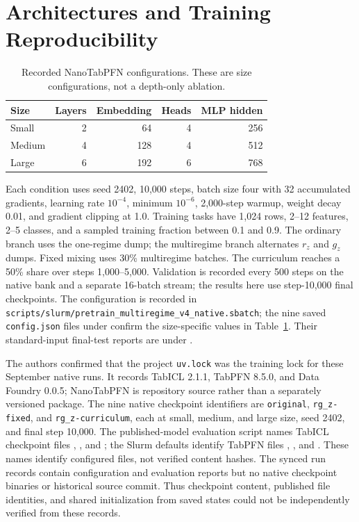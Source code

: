 \documentclass{article}
\begin{document}
\section{Architectures and Training Reproducibility}\label{app:training}
\begin{table}[h]\centering\small
\caption{Recorded NanoTabPFN configurations. These are size configurations, not a depth-only ablation.}\label{tab:arch}
\begin{tabular}{@{}lrrrr@{}}\toprule Size & Layers & Embedding & Heads & MLP hidden\\\midrule
Small & 2 & 64 & 4 & 256\\ Medium & 4 & 128 & 4 & 512\\ Large & 6 & 192 & 6 & 768\\\bottomrule\end{tabular}\end{table}
Each condition uses seed 2402, 10,000 steps, batch size four with 32 accumulated gradients, learning rate $10^{-4}$, minimum $10^{-6}$, 2,000-step warmup, weight decay 0.01, and gradient clipping at 1.0. Training tasks have 1,024 rows, 2--12 features, 2--5 classes, and a sampled training fraction between 0.1 and 0.9. The ordinary branch uses the one-regime dump; the multiregime branch alternates $r_z$ and $g_z$ dumps. Fixed mixing uses 30\% multiregime batches. The curriculum reaches a 50\% share over steps 1,000--5,000. Validation is recorded every 500 steps on the native bank and a separate 16-batch stream; the results here use step-10,000 final checkpoints. The configuration is recorded in \texttt{scripts/slurm/pretrain\_multiregime\_v4\_native.sbatch}; the nine saved \texttt{config.json} files under  confirm the size-specific values in Table~\ref{tab:arch}. Their standard-input final-test reports are under .

The authors confirmed that the project \texttt{uv.lock} was the training lock for these September native runs. It records TabICL 2.1.1, TabPFN 8.5.0, and Data Foundry 0.0.5; NanoTabPFN is repository source rather than a separately versioned package. The nine native checkpoint identifiers are \texttt{original}, \texttt{rg\_z-fixed}, and \texttt{rg\_z-curriculum}, each at small, medium, and large size, seed 2402, and final step 10,000. The published-model evaluation script names TabICL checkpoint files , , and ; the Slurm defaults identify TabPFN files , , and . These names identify configured files, not verified content hashes. The synced run records contain configuration and evaluation reports but no native checkpoint binaries or historical source commit. Thus checkpoint content, published file identities, and shared initialization from saved states could not be independently verified from these records.
\end{document}
